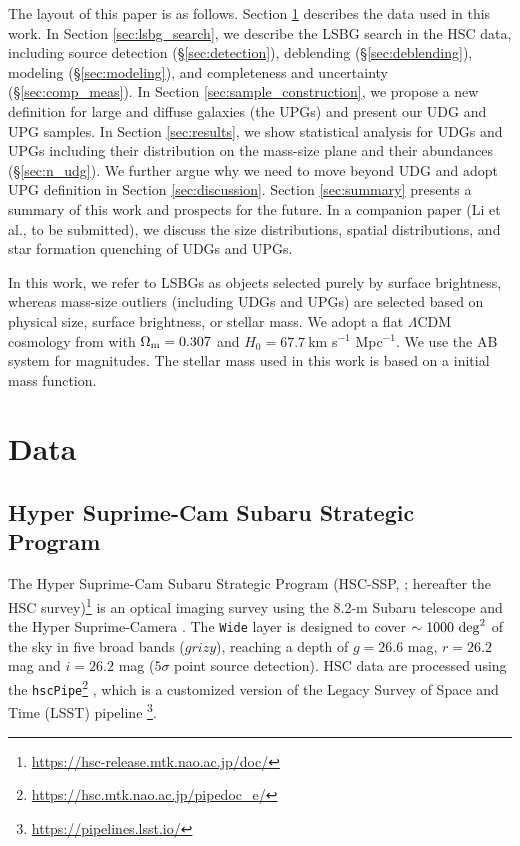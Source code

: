 \documentclass[twocolumn,astrosymb,twocolappendix]{aastex631}
\newcommand{\code}[1]{\texttt{#1}}
\begin{document}
\begin{CJK*}{UTF8}{gbsn}

The layout of this paper is as follows. Section \ref{sec:data} describes the data used in this work. In Section \ref{sec:lsbg_search}, we describe the LSBG search in the HSC data, including source detection (\S \ref{sec:detection}), deblending (\S \ref{sec:deblending}), modeling (\S \ref{sec:modeling}), and completeness and uncertainty (\S\ref{sec:comp_meas}). In Section \ref{sec:sample_construction}, we propose a new definition for large and diffuse galaxies (the UPGs) and present our UDG and UPG samples. In Section \ref{sec:results}, we show statistical analysis for UDGs and UPGs including their distribution on the mass-size plane and their abundances (\S \ref{sec:n_udg}). We further argue why we need to move beyond UDG and adopt UPG definition in Section \ref{sec:discussion}. Section \ref{sec:summary} presents a summary of this work and prospects for the future. In a companion paper (Li et al., to be submitted), we discuss the size distributions, spatial distributions, and star formation quenching of UDGs and UPGs. 

In this work, we refer to LSBGs as objects selected purely by surface brightness, whereas mass-size outliers (including UDGs and UPGs) are selected based on physical size, surface brightness, or stellar mass. We adopt a flat $\Lambda$CDM cosmology from \citet{Planck15} with $\Omega_{\rm m}= 0.307$ and $H_0 = 67.7\ $km s$^{-1}$ Mpc$^{-1}$. We use the AB system \citep{Oke1983} for magnitudes. The stellar mass used in this work is based on a \citet{Chabrier2003} initial mass function.


\section{Data} \label{sec:data}
\subsection{Hyper Suprime-Cam Subaru Strategic Program}
The Hyper Suprime-Cam Subaru Strategic Program (HSC-SSP, \citealt{Aihara2018}; hereafter the HSC survey)\footnote{\url{https://hsc-release.mtk.nao.ac.jp/doc/}} is an optical imaging survey using the 8.2-m Subaru telescope and the Hyper Suprime-Camera \citep{Miyazaki2012, Miyazaki2018}. The \texttt{Wide} layer is designed to cover $\sim 1000\ \rm{deg}^{2}$ of the sky in five broad bands ($grizy$), reaching a depth of $g=26.6$ mag, $r=26.2$ mag and $i=26.2$ mag ($5\sigma$ point source detection). HSC data are processed using the \code{hscPipe}\footnote{\url{https://hsc.mtk.nao.ac.jp/pipedoc_e/}} \citep{Bosch2018}, which is a customized version of the Legacy Survey of Space and Time (LSST) pipeline \citep{LSST-pipeline}\footnote{\url{https://pipelines.lsst.io/}}.


\end{CJK*}
\end{document}
